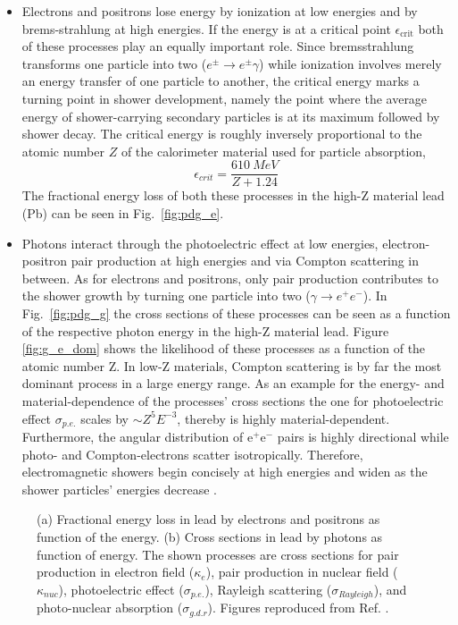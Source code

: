 \documentclass[../../main.tex]{subfiles}
\begin{document}
\begin{itemize}
	\item Electrons and positrons lose energy by ionization at low energies and by brems-strahlung at high energies. If the energy is at a critical point $\epsilon_\text{crit}$ both of these processes play an equally important role. Since bremsstrahlung transforms one particle into two ($e^{\pm}\rightarrow e^{\pm}\gamma$) while ionization involves merely an energy transfer of one particle to another, the critical energy marks a turning point in shower development, namely the point where the average energy of shower-carrying secondary particles is at its maximum followed by shower decay. The critical energy is roughly inversely proportional to the atomic number $Z$ of the calorimeter material used for particle absorption,
		\begin{equation}\label{eq:e_crit}
			\epsilon_{crit} = \frac{\SI{610}{MeV}}{Z+1.24}
		\end{equation}
		The fractional energy loss of both these processes in the high-Z material lead (Pb) can be seen in Fig.~\ref{fig:pdg_e}.
	\item Photons interact through the photoelectric effect at low energies, electron-positron pair production at high energies and via Compton scattering in between. As for electrons and positrons, only pair production contributes to the shower growth by turning one particle into two ($\gamma\rightarrow e^+e^-$). In Fig.~\ref{fig:pdg_g} the cross sections of these processes can be seen as a function of the respective photon energy in the high-Z material lead. Figure \ref{fig:g_e_dom} shows the likelihood of these processes as a function of the atomic number Z. In low-Z materials, Compton scattering is by far the most dominant process in a large energy range. As an example for the energy- and material-dependence of the processes' cross sections the one for photoelectric effect $\sigma_{p.e.}$ scales by $\sim Z^5E^{-3}$, thereby is highly material-dependent. Furthermore, the angular distribution of e$^+$e$^-$ pairs is highly directional while photo- and Compton-electrons scatter isotropically. Therefore, electromagnetic showers begin concisely at high energies and widen as the shower particles' energies decrease \cite{wigmans08}.
\end{itemize}
\begin{figure}[htp]
	\centering
	\caption{(a) Fractional energy loss in lead by electrons and positrons as function of the energy. (b) Cross sections in lead by photons as function of energy. The shown processes are cross sections for pair production in electron field ($\kappa_e$), pair production in nuclear field ($\kappa_{nuc}$), photoelectric effect ($\sigma_{p.e.}$), Rayleigh scattering ($\sigma_{Rayleigh}$), and photo-nuclear absorption ($\sigma_{g.d.r}$). Figures reproduced from Ref. \cite{pdg}.} \label{fig:pdg}
\end{figure}
\end{document}
